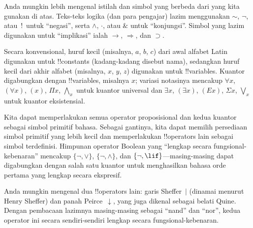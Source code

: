 \documentclass[../../../include/open-logic-section]{subfiles}
\begin{document}

\begin{intro}
Anda mungkin lebih mengenal istilah dan simbol yang berbeda dari yang kita
gunakan di atas. Teks-teks logika (dan para pengajar) lazim menggunakan
$\sim$, $\neg$, atau~!\ untuk ``negasi'', serta $\wedge$, $\cdot$, atau $\&$
untuk ``konjungsi''. Simbol yang lazim digunakan untuk ``implikasi'' ialah
$\rightarrow$, $\Rightarrow$, dan $\supset$.

Secara konvensional, huruf kecil (misalnya, $a$, $b$, $c$) dari awal alfabet
Latin digunakan untuk !!{constant}s (kadang-kadang disebut nama), sedangkan
huruf kecil dari akhir alfabet (misalnya, $x$, $y$, $z$) digunakan untuk
!!{variable}s. Kuantor digabungkan dengan !!{variable}s, misalnya $x$;
variasi notasinya mencakup $\forall x$, $(\forall x)$, $(x)$, $\Pi x$,
$\bigwedge_x$ untuk kuantor universal dan $\exists x$, $(\exists x)$,
$(Ex)$, $\Sigma x$, $\bigvee_x$ untuk kuantor eksistensial.
\end{intro}

\begin{explain}
Kita dapat memperlakukan semua operator proposisional dan kedua kuantor
sebagai simbol primitif bahasa. Sebagai gantinya, kita dapat memilih
persediaan simbol primitif yang lebih kecil dan memperlakukan !!{operator}s
lain sebagai simbol terdefinisi. Himpunan operator Boolean yang ``lengkap
secara fungsional-kebenaran'' mencakup $\{ \lnot, \lor \}$, $\{ \lnot,
\land \}$, dan $\{ \lnot, \lif\}$---masing-masing dapat digabungkan dengan
salah satu kuantor untuk menghasilkan bahasa orde pertama yang lengkap
secara ekspresif.

Anda mungkin mengenal dua !!{operator}s lain: garis Sheffer~$|$ (dinamai
menurut Henry Sheffer) dan panah Peirce~$\downarrow$, yang juga dikenal
sebagai belati Quine. Dengan pembacaan lazimnya masing-masing sebagai
``nand'' dan ``nor'', kedua operator ini secara sendiri-sendiri lengkap
secara fungsional-kebenaran.
\end{explain}
\end{document}
